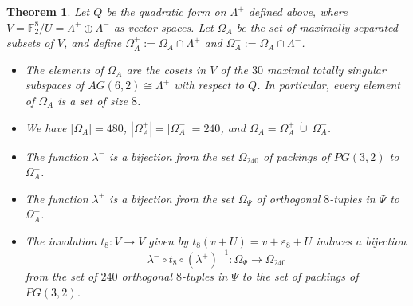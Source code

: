 \documentclass{amsart}
\theoremstyle{plain}
\newtheorem{theorem}{Theorem}[section]
\theoremstyle{definition}
\theoremstyle{remark}
\numberwithin{equation}{section}
\newcommand{\ep}{\varepsilon}
\newcommand{\F}{{\mathbb F}}
\newcommand{\ra}{\rightarrow}
\newcommand{\qpx}{\Omega_{240}}
\newcommand{\qp}{\Omega}
\newcommand{\lamp}{\Lambda^+}
\newcommand{\slm}{\lambda^-}
\newcommand{\slp}{\lambda^+}
\newcommand{\lamm}{\Lambda^-}
\begin{document}
\begin{theorem}\label{thm:corresp}
Let $Q$ be the quadratic form on $\lamp$ defined above, where $V = \F_2^8/U = \lamp \oplus \lamm$ as vector spaces.
Let $\qp_A$ be the set of maximally separated subsets of $V$, and define $\qp^+_A := \qp_A \cap \lamp$ and
$\qp^-_A := \qp_A \cap \lamm$.
\begin{itemize}
\item[{\rm (i)}]{The elements of $\qp_A$ are the cosets in $V$ of the $30$ maximal totally singular subspaces of 
$AG(6, 2) \cong \lamp$ with respect to $Q$. In particular, every element of $\qp_A$ is a set of size $8$.}
\item[{\rm (ii)}]{We have $|\qp_A|=480$, $|\qp^+_A| = |\qp^-_A| = 240$, and $\qp_A = \qp^+_A \ \dot\cup \ \qp^-_A$.}
\item[{\rm (iii)}]{The function $\slm$ is a bijection from the set $\qpx$ of packings of $PG(3, 2)$ to $\qp^-_A$.}
\item[{\rm (iv)}]{The function $\slp$ is a bijection from the set $\qp_\Psi$ of orthogonal $8$-tuples in $\Psi$ to
$\qp^+_A$.}
\item[{\rm (v)}]{The involution $t_8 : V \ra V$ given by $t_8(v + U) = v + \ep_8 + U$ induces a 
bijection $$
\slm \circ t_8 \circ (\slp)^{-1} : \qp_\Psi \ra \qpx
$$ from the set of $240$ orthogonal $8$-tuples in $\Psi$ to the set of packings of $PG(3, 2)$.}
\end{itemize}
\end{theorem}
\end{document}
